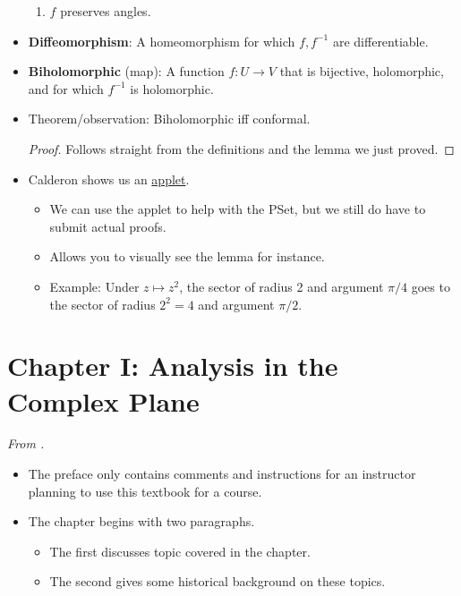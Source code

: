 \documentclass[../notes.tex]{subfiles}
\begin{document}
\begin{itemize}
\begin{enumerate}
        \item $f$ preserves angles.
    \end{enumerate}
    \item \textbf{Diffeomorphism}: A homeomorphism for which $f,f^{-1}$ are differentiable.
    \item \textbf{Biholomorphic} (map): A function $f:U\to V$ that is bijective, holomorphic, and for which $f^{-1}$ is holomorphic.
    \item Theorem/observation: Biholomorphic iff conformal.
    \begin{proof}
        Follows straight from the definitions and the lemma we just proved.
    \end{proof}
    \item Calderon shows us an \href{https://wqferr.github.io/SimplyComplex/}{applet}.
    \begin{itemize}
        \item We can use the applet to help with the PSet, but we still do have to submit actual proofs.
        \item Allows you to visually see the lemma for instance.
        \item Example: Under $z\mapsto z^2$, the sector of radius 2 and argument $\pi/4$ goes to the sector of radius $2^2=4$ and argument $\pi/2$.
    \end{itemize}
\end{itemize}



\section{Chapter I: Analysis in the Complex Plane}
\emph{From \textcite{bib:FischerLieb}.}
\begin{itemize}
    \item {}The preface only contains comments and instructions for an instructor planning to use this textbook for a course.
    \item The chapter begins with two paragraphs.
    \begin{itemize}
        \item The first discusses topic covered in the chapter.
        \item The second gives some historical background on these topics.
    \end{itemize}
\end{itemize}
\end{document}

